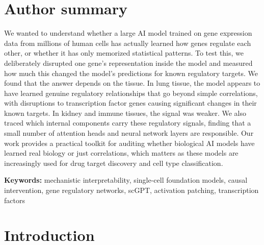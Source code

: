 \documentclass[10pt,letterpaper]{article}
\begin{document}

\section*{Author summary}

We wanted to understand whether a large AI model trained on gene expression
data from millions of human cells has actually learned how genes regulate each
other, or whether it has only memorized statistical patterns. To test this, we
deliberately disrupted one gene's representation inside the model and measured
how much this changed the model's predictions for known regulatory targets.
We found that the answer depends on the tissue. In lung tissue, the model
appears to have learned genuine regulatory relationships that go beyond simple
correlations, with disruptions to transcription factor genes causing
significant changes in their known targets. In kidney and immune tissues, the
signal was weaker. We also traced which internal components carry these
regulatory signals, finding that a small number of attention heads and neural
network layers are responsible. Our work provides a practical toolkit for
auditing whether biological AI models have learned real biology or just
correlations, which matters as these models are increasingly used for drug
target discovery and cell type classification.


\noindent\textbf{Keywords:} mechanistic interpretability, single-cell foundation models, causal intervention, gene regulatory networks, scGPT, activation patching, transcription factors


\section*{Introduction}
\end{document}
